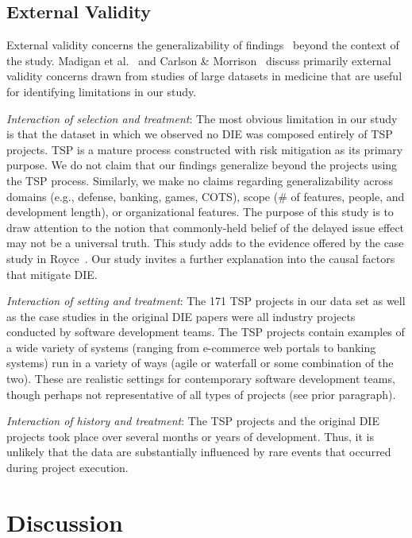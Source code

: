 \documentclass[smallcondensed]{svjour3}
\begin{document}
\subsection{External Validity}
\label{sect:external_validity}
External validity concerns the generalizability of findings~\cite{wohlin2012} beyond the context of the study. Madigan et al.~\cite{madigan2014} and Carlson \& Morrison~\cite{carlson2009} discuss primarily external validity concerns drawn from studies of large datasets in medicine that are useful for identifying limitations in our study.

\textit{Interaction of selection and treatment}: The most obvious limitation in our study is that the dataset in which we observed no DIE was composed entirely of TSP projects. TSP is a mature process constructed with risk mitigation as its primary purpose. We do not claim that our findings generalize beyond the projects using the TSP process. Similarly, we make no claims regarding generalizability across domains (e.g., defense, banking, games, COTS), scope (\# of features, people, and development length), or organizational features. The purpose of this study is to draw attention to the notion that commonly-held belief of the delayed issue effect may not be a universal truth. This study adds to the evidence offered by the case study in Royce~\cite{Royce98}. Our study invites a further explanation into the causal factors that mitigate DIE.



\textit{Interaction of setting and treatment}: The 171 TSP projects in our data set as well as the case studies in the original DIE papers were all industry projects conducted by software development teams. The TSP projects contain examples of a wide variety
 of systems (ranging from e-commerce web portals to  banking systems) run in a variety of
 ways (agile or  waterfall or some combination of the two). These are realistic settings for contemporary software development teams, though perhaps not representative of all types of projects (see prior paragraph). 


\textit{Interaction of history and treatment}: The TSP projects and the original DIE projects took place over several months or years of development. Thus, it is unlikely that the data are substantially influenced by rare events that occurred during project execution.


 
 \section{Discussion}
 \label{sect:discussion}
\end{document}
